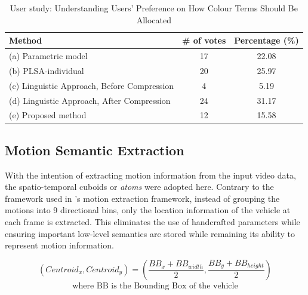\begin{table}[H]\centering
\begin{tabular}{|l|c|c|}
\hline
\textbf{Method}                             & \textbf{\# of votes} & \textbf{Percentage (\%)} \\ \hline
(a) Parametric model                        & 17                   & 22.08              \\ \hline
(b) PLSA-individual                         & 20                   & 25.97              \\ \hline
(c) Linguistic Approach, Before Compression & 4                    & 5.19              \\ \hline
(d) Linguistic Approach, After Compression  & 24                   & 31.17              \\ \hline
(e) Proposed method                         & 12                   & 15.58              \\ \hline
\end{tabular}
\caption{User study: Understanding Users' Preference on How Colour Terms Should Be Allocated}
\label{tab:munsell_result}
\end{table}

\vspace{-2em}




\subsection{Motion Semantic Extraction}
\label{subsec:chamferdistancemotionextraction}

With the intention of extracting motion information from the input video data, the spatio-temporal cuboids or \emph{atoms} were adopted here. Contrary to the framework used in \versionOneExt's motion extraction framework, instead of grouping the motions into 9 directional bins, only the location information of the vehicle at each frame is extracted. This eliminates the use of handcrafted parameters while ensuring important low-level semantics are stored while remaining its ability to represent motion information.


\begin{equation}
\label{eq:centroid}
(Centroid_x, Centroid_y) = (\frac{BB_{x}+BB_{width}}{2} , \frac{BB_{y}+BB_{height}}{2})
\end{equation}
\vspace{-2em}
\begin{align*}
    \text{where BB is the Bounding Box of the vehicle}
\end{align*}

